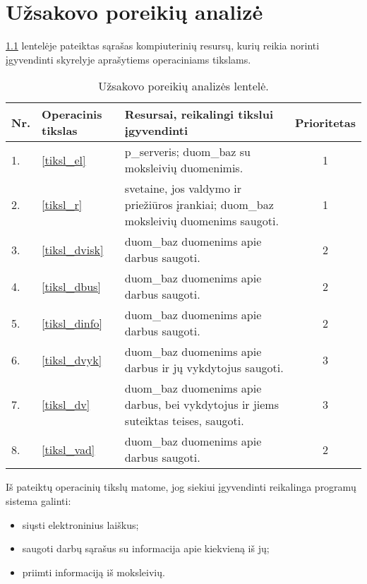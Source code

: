 \chapter{Užsakovo poreikių analizė}

\ref{tab:poreikiai} lentelėje pateiktas sąrašas kompiuterinių resursų, 
kurių reikia norinti įgyvendinti \emph{}
skyrelyje aprašytiems operaciniams tikslams.

\begin{table}[h!]
  \centering
  \begin{tabular}[]{| l | p{1.6cm} | p{5.8cm} | c |}
    \hline
    Nr. & Operacinis tikslas & Resursai, reikalingi tikslui įgyvendinti &
    Prioritetas \\
    \hline
    1. & \ref{tiksl_el} & 
      \Gls{p_serveris}; \gls{duom_baz} su moksleivių duomenimis. & 1 \\
    \hline
    2. & \ref{tiksl_r} & 
      \Gls{svetaine}, jos valdymo ir priežiūros įrankiai; 
      \gls{duom_baz} moksleivių duomenims saugoti. & 1 \\
    \hline
    3. & \ref{tiksl_dvisk} &
      \Gls{duom_baz} duomenims apie darbus saugoti. & 2 \\
    \hline
    4. & \ref{tiksl_dbus} &
      \Gls{duom_baz} duomenims apie darbus saugoti. & 2 \\
    \hline
    5. & \ref{tiksl_dinfo} &
      \Gls{duom_baz} duomenims apie darbus saugoti. & 2 \\
    \hline
    6. & \ref{tiksl_dvyk} &
      \Gls{duom_baz} duomenims apie darbus ir jų vykdytojus 
      saugoti. & 3 \\
    \hline
    7. & \ref{tiksl_dv} &
      \Gls{duom_baz} duomenims apie darbus, bei vykdytojus ir 
      jiems suteiktas teises, saugoti. & 3 \\
    \hline
    8. & \ref{tiksl_vad} &
      \Gls{duom_baz} duomenims apie darbus saugoti. & 2 \\
    \hline
  \end{tabular}
  \caption{Užsakovo poreikių analizės lentelė.}
  \label{tab:poreikiai}
\end{table}

Iš pateiktų operacinių tikslų matome, jog siekiui įgyvendinti reikalinga
programų sistema galinti:
\begin{itemize}
  \item siųsti elektroninius laiškus;
  \item saugoti darbų sąrašus su informacija apie kiekvieną iš jų;
  \item priimti informaciją iš moksleivių.
\end{itemize}
